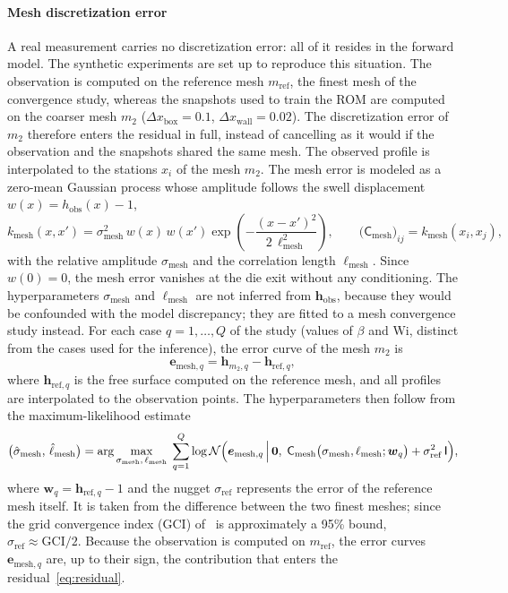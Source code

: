 \documentclass{elsarticle}
\renewcommand{\vec}[1]{\boldsymbol{#1}}
\newcommand{\mat}[1]{\mathsf{#1}}
\newcommand{\wi}{\mathrm{Wi}}
\newcommand{\submesh}{\mathrm{mesh}}        %
\newcommand{\obs}{\mathrm{obs}}
\begin{document}
\paragraph{Mesh discretization error}
A real measurement carries no discretization error: all of it resides in the
forward model. The synthetic experiments are set up to reproduce this
situation. The observation is computed on the reference mesh
$m_{\mathrm{ref}}$, the finest mesh of the convergence study, whereas the
snapshots used to train the ROM are computed on the coarser mesh $m_2$
($\Delta x_{\mathrm{box}} = 0.1$, $\Delta x_{\mathrm{wall}} = 0.02$). The
discretization error of $m_2$ therefore enters the residual in full, instead of
cancelling as it would if the observation and the snapshots shared the same
mesh. The observed profile is interpolated to the stations $x_i$ of the mesh
$m_2$. The mesh error is modeled as a zero-mean Gaussian process whose amplitude
follows the swell displacement $w(x) = h_{\obs}(x) - 1$,
\begin{equation}
k_{\submesh}(x,x')
= \sigma_{\submesh}^{2}\,w(x)\,w(x')
  \exp\!\left(-\dfrac{(x - x')^{2}}{2\,\ell_{\submesh}^{2}}\right),
\qquad
\bigl(\mat{C}_{\submesh}\bigr)_{ij} = k_{\submesh}(x_{i},x_{j}),
\label{eq:kernel_mesh}
\end{equation}
with the relative amplitude $\sigma_{\submesh}$ and the correlation length
$\ell_{\submesh}$. Since $w(0)=0$, the mesh error vanishes at the die exit
without any conditioning. The hyperparameters $\sigma_{\submesh}$ and
$\ell_{\submesh}$ are not inferred from $\vec{h}_{\obs}$, because they would be
confounded with the model discrepancy; they are fitted to a mesh convergence
study instead. For each case $q=1,\dots,Q$ of the study (values of $\beta$ and
$\wi$, distinct from the cases used for the inference), the error curve of the
mesh $m_2$ is
\begin{equation}
\vec{e}_{\submesh,q} = \vec{h}_{m_2,q} - \vec{h}_{\mathrm{ref},q},
\label{eq:mesh_error_curves}
\end{equation}
where $\vec{h}_{\mathrm{ref},q}$ is the free surface computed on the reference
mesh, and all profiles are interpolated to the observation points. The
hyperparameters then follow from the maximum-likelihood estimate
\begin{equation}
\bigl(\hat{\sigma}_{\submesh},\,\hat{\ell}_{\submesh}\bigr)
= \arg\max_{\sigma_{\submesh},\,\ell_{\submesh}}\;
  \sum_{q=1}^{Q}
  \log \mathcal{N}\Bigl(\vec{e}_{\submesh,q} \,\Big|\, \vec{0},\;
  \mat{C}_{\submesh}\bigl(\sigma_{\submesh},\ell_{\submesh};\vec{w}_{q}\bigr)
  + \sigma_{\mathrm{ref}}^{2}\,\mat{I}\Bigr),
\label{eq:mesh_mle}
\end{equation}
where $\vec{w}_{q} = \vec{h}_{\mathrm{ref},q} - 1$ and the nugget
$\sigma_{\mathrm{ref}}$ represents the error of the reference mesh itself. It
is taken from the difference between the two finest meshes; since the grid
convergence index (GCI) of~\cite{celik2008procedure} is approximately a 95\%
bound, $\sigma_{\mathrm{ref}}\approx\mathrm{GCI}/2$. Because the observation is
computed on $m_{\mathrm{ref}}$, the error curves $\vec{e}_{\submesh,q}$ are, up
to their sign, the contribution that enters the
residual~\eqref{eq:residual}.
\end{document}
